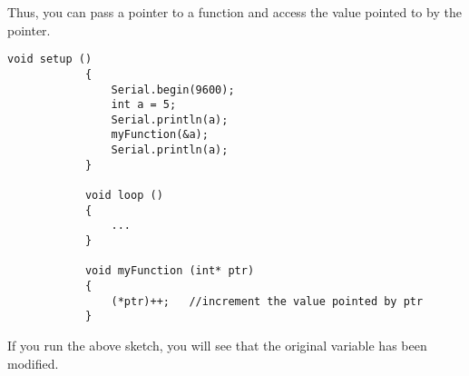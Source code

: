 \documentclass{article}
\begin{document}
			Thus, you can pass a pointer to a function and access the value pointed to by the pointer.

			\begin{lstlisting}[gobble=12]
			void setup ()
			{
				Serial.begin(9600);
				int a = 5;
				Serial.println(a);
				myFunction(&a);
				Serial.println(a);
			}

			void loop ()
			{
				...
			}

			void myFunction (int* ptr)
			{
				(*ptr)++;	//increment the value pointed by ptr
			}
			\end{lstlisting}

			If you run the above sketch, you will see that the original variable  has been modified.
\end{document}
